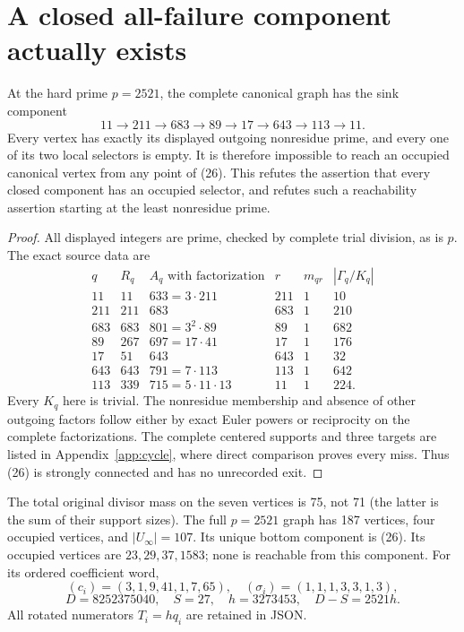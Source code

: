 \section{A closed all-failure component actually exists}
\begin{theorem}\label{thm:counter}
At the hard prime $p=2521$, the complete canonical graph has the sink component
\[
 \boxed{11\to211\to683\to89\to17\to643\to113\to11.}     \tag{26}
\]
Every vertex has exactly its displayed outgoing nonresidue prime, and every
one of its two local selectors is empty. It is therefore impossible to reach
an occupied canonical vertex from any point of (26). This refutes the assertion
that every closed component has an occupied selector, and refutes such a
reachability assertion starting at the least nonresidue prime.
\end{theorem}
\begin{proof}
All displayed integers are prime, checked by complete trial division, as is
$p$. The exact source data are
\[
\begin{array}{r|r|l|r|r|r}
 q&R_q&A_q\text{ with factorization}&r&m_{qr}&|\Gamma_q/K_q|\\\hline
11&11&633=3\cdot211&211&1&10\\
211&211&683&683&1&210\\
683&683&801=3^2\cdot89&89&1&682\\
89&267&697=17\cdot41&17&1&176\\
17&51&643&643&1&32\\
643&643&791=7\cdot113&113&1&642\\
113&339&715=5\cdot11\cdot13&11&1&224.
\end{array}                                                \tag{27}
\]
Every $K_q$ here is trivial. The nonresidue membership and absence of other
outgoing factors follow either by exact Euler powers or reciprocity on the
complete factorizations. The complete centered supports and three targets are
listed in Appendix~\ref{app:cycle}, where direct comparison proves every miss.
Thus (26) is strongly connected and has no unrecorded exit.
\end{proof}
The total original divisor mass on the seven vertices is 75, not 71 (the latter
is the sum of their support sizes). The full $p=2521$ graph has 187 vertices,
four occupied vertices, and $|U_\infty|=107$. Its unique bottom component is
(26). Its occupied vertices are $23,29,37,1583$; none is reachable from this component.
For its ordered coefficient word,
\[
 (c_i)=(3,1,9,41,1,7,65),\quad(\sigma_i)=(1,1,1,3,3,1,3),
\]
\[
 D=8252375040,\quad S=27,\quad h=3273453,
 \quad D-S=2521h.                                        \tag{28}
\]
All rotated numerators $T_i=hq_i$ are retained in JSON.


